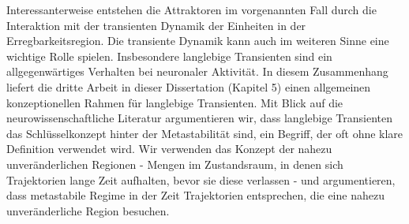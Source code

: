Interessanterweise entstehen die Attraktoren im vorgenannten Fall durch die Interaktion mit der transienten Dynamik der Einheiten in der Erregbarkeitsregion. Die transiente Dynamik kann auch im weiteren Sinne eine wichtige Rolle spielen. Insbesondere langlebige Transienten sind ein allgegenwärtiges Verhalten bei neuronaler Aktivität. In diesem Zusammenhang liefert die dritte Arbeit in dieser Dissertation (Kapitel 5) einen allgemeinen konzeptionellen Rahmen für langlebige Transienten. Mit Blick auf die neurowissenschaftliche Literatur argumentieren wir, dass langlebige Transienten das Schlüsselkonzept hinter der Metastabilität sind, ein Begriff, der oft ohne klare Definition verwendet wird. Wir verwenden das Konzept der nahezu unveränderlichen Regionen - Mengen im Zustandsraum, in denen sich Trajektorien lange Zeit aufhalten, bevor sie diese verlassen - und argumentieren, dass metastabile Regime in der Zeit Trajektorien entsprechen, die eine nahezu unveränderliche Region besuchen.



